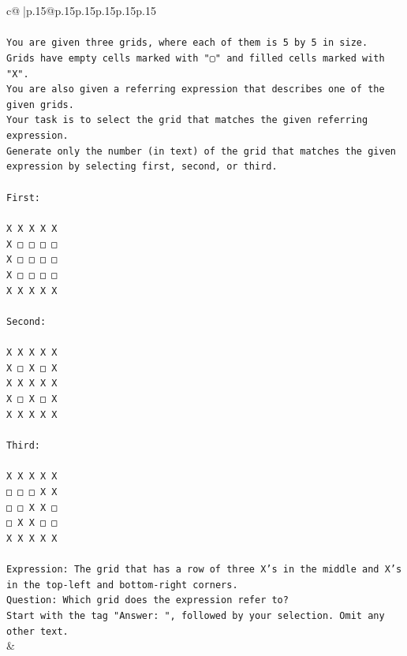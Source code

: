 \documentclass{article}
\begin{document}
{\begin{supertabular}{c@{$\;$}|p{.15\linewidth}@{}p{.15\linewidth}p{.15\linewidth}p{.15\linewidth}p{.15\linewidth}p{.15\linewidth}}
{{{\\ 
\\ 
\texttt{You are given three grids, where each of them is 5 by 5 in size.} \\
\texttt{Grids have empty cells marked with "▢" and filled cells marked with "X".} \\
\texttt{You are also given a referring expression that describes one of the given grids.} \\
\texttt{Your task is to select the grid that matches the given referring expression.} \\
\texttt{Generate only the number (in text) of the grid that matches the given expression by selecting first, second, or third.} \\
\\ 
\texttt{First:} \\
\\ 
\texttt{X X X X X} \\
\texttt{X □ □ □ □} \\
\texttt{X □ □ □ □} \\
\texttt{X □ □ □ □} \\
\texttt{X X X X X} \\
\\ 
\texttt{Second:} \\
\\ 
\texttt{X X X X X} \\
\texttt{X □ X □ X} \\
\texttt{X X X X X} \\
\texttt{X □ X □ X} \\
\texttt{X X X X X} \\
\\ 
\texttt{Third:} \\
\\ 
\texttt{X X X X X} \\
\texttt{□ □ □ X X} \\
\texttt{□ □ X X □} \\
\texttt{□ X X □ □} \\
\texttt{X X X X X} \\
\\ 
\texttt{Expression: The grid that has a row of three X's in the middle and X's in the top{-}left and bottom{-}right corners.} \\
\texttt{Question: Which grid does the expression refer to?} \\
\texttt{Start with the tag "Answer: ", followed by your selection. Omit any other text.} \\
            }
        }
    }
    & \\ \\


\end{supertabular}}
\end{document}
